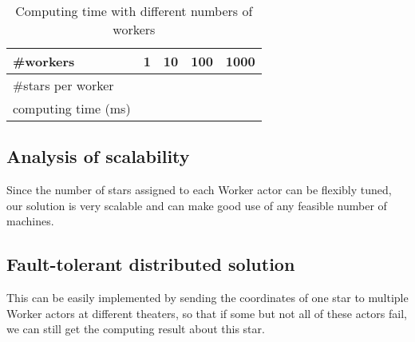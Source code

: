 \documentclass[12pt,letterpaper]{article}
\begin{document}
\begin{table}
\begin{center}
\caption{Computing time with different numbers of workers}
\begin{tabular}{l|r|r|r|r}
\#workers & 1 & 10 & 100 & 1000\\
\hline
\#stars per worker & & & &\\
\hline
computing time (ms) & & & &
\end{tabular}
\end{center}
\end{table}

\subsection*{Analysis of scalability}
Since the number of stars assigned to each Worker actor can be flexibly tuned, our solution is very scalable and can make good use of any feasible number of machines.

\subsection*{Fault-tolerant distributed solution}
This can be easily implemented by sending the coordinates of one star to multiple Worker actors at different theaters, so that if some but not all of these actors fail, we can still get the computing result about this star.
\end{document}
